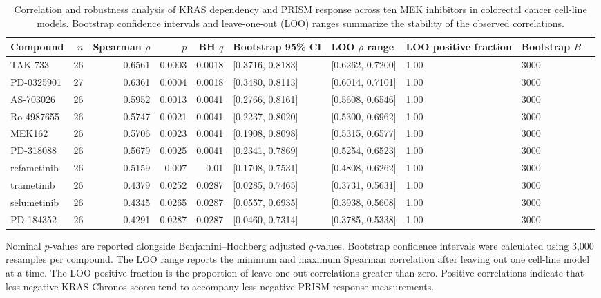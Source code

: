 
\begin{table}[htbp]
\centering
\caption{Correlation and robustness analysis of KRAS dependency
and PRISM response across ten MEK inhibitors in colorectal cancer
cell-line models. Bootstrap confidence intervals and leave-one-out
(LOO) ranges summarize the stability of the observed correlations.}
\label{tab:kras_mek_robustness}
\small
\setlength{\tabcolsep}{4pt}
\renewcommand{\arraystretch}{1.15}
\begin{tabular}{lrrrrllllr}
\toprule
Compound & $n$ & Spearman $\rho$ & $p$ & BH $q$
& Bootstrap 95\% CI & LOO $\rho$ range
& LOO positive fraction & Bootstrap $B$ \\
\midrule
TAK-733 & 26 & 0.6561 & 0.0003 & 0.0018 & [0.3716, 0.8183] & [0.6262, 0.7200] & 1.00 & 3000 \\
PD-0325901 & 27 & 0.6361 & 0.0004 & 0.0018 & [0.3480, 0.8113] & [0.6014, 0.7101] & 1.00 & 3000 \\
AS-703026 & 26 & 0.5952 & 0.0013 & 0.0041 & [0.2766, 0.8161] & [0.5608, 0.6546] & 1.00 & 3000 \\
Ro-4987655 & 26 & 0.5747 & 0.0021 & 0.0041 & [0.2237, 0.8020] & [0.5300, 0.6962] & 1.00 & 3000 \\
MEK162 & 26 & 0.5706 & 0.0023 & 0.0041 & [0.1908, 0.8098] & [0.5315, 0.6577] & 1.00 & 3000 \\
PD-318088 & 26 & 0.5679 & 0.0025 & 0.0041 & [0.2341, 0.7869] & [0.5254, 0.6523] & 1.00 & 3000 \\
refametinib & 26 & 0.5159 & 0.007 & 0.01 & [0.1708, 0.7531] & [0.4808, 0.6262] & 1.00 & 3000 \\
trametinib & 26 & 0.4379 & 0.0252 & 0.0287 & [0.0285, 0.7465] & [0.3731, 0.5631] & 1.00 & 3000 \\
selumetinib & 26 & 0.4345 & 0.0265 & 0.0287 & [0.0557, 0.6935] & [0.3938, 0.5608] & 1.00 & 3000 \\
PD-184352 & 26 & 0.4291 & 0.0287 & 0.0287 & [0.0460, 0.7314] & [0.3785, 0.5338] & 1.00 & 3000 \\
\bottomrule
\end{tabular}

\vspace{2mm}
\begin{minipage}{0.96\textwidth}
\footnotesize
Nominal $p$-values are reported alongside Benjamini--Hochberg
adjusted $q$-values. Bootstrap confidence intervals were calculated
using 3,000 resamples per compound. The LOO range reports the
minimum and maximum Spearman correlation after leaving out one
cell-line model at a time. The LOO positive fraction is the
proportion of leave-one-out correlations greater than zero.
Positive correlations indicate that less-negative KRAS Chronos
scores tend to accompany less-negative PRISM response measurements.
\end{minipage}
\end{table}
